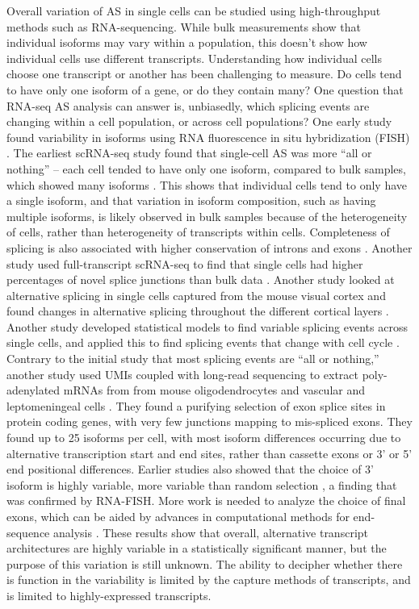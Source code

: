 Overall variation of AS in single cells can be studied using high\hyp{}throughput methods such as RNA-sequencing. While bulk measurements show that individual isoforms may vary within a population, this doesn't show how individual cells use different transcripts. Understanding how individual cells choose one transcript or another has been challenging to measure. Do cells tend to have only one isoform of a gene, or do they contain many? One question that RNA-seq AS analysis can answer is, unbiasedly, which splicing events are changing within a cell population, or across cell populations? One early study found variability in isoforms using RNA fluorescence in situ hybridization (FISH) \cite{Waks2011-ye}. The earliest scRNA-seq study found that single-cell AS was more ``all or nothing'' -- each cell tended to have only one isoform, compared to bulk samples, which showed many isoforms \cite{Shalek2013-ez}. This shows that individual cells tend to only have a single isoform, and that variation in isoform composition, such as having multiple isoforms, is likely observed in bulk samples because of the heterogeneity of cells, rather than heterogeneity of transcripts within cells. Completeness of splicing is also associated with higher conservation of introns and exons \cite{Faigenbloom2015-jo}. Another study used full-transcript scRNA-seq to find that single cells had higher percentages of novel splice junctions than bulk data \cite{Marinov2014-iw}. Another study looked at alternative splicing in single cells captured from the mouse visual cortex and found changes in alternative splicing throughout the different cortical layers \cite{Tasic2016-et}. Another study developed statistical models to find variable splicing events across single cells, and applied this to find splicing events that change with cell cycle \cite{Welch2016-it}. Contrary to the initial study that most splicing events are ``all or nothing,'' another study used UMIs coupled with long-read sequencing to extract poly-adenylated mRNAs from from mouse oligodendrocytes and vascular and leptomeningeal cells \cite{Karlsson2017-wy}. They found a purifying selection of exon splice sites in protein coding genes, with very few junctions mapping to mis-spliced exons. They found up to 25 isoforms per cell, with most isoform differences occurring due to alternative transcription start and end sites, rather than cassette exons or 3' or 5' end positional differences. Earlier studies also showed that the choice of 3' isoform is highly variable, more variable than random selection \cite{Velten2015-zd}, a finding that was confirmed by RNA-FISH. More work is needed to analyze the choice of final exons, which can be aided by advances in computational methods for end-sequence analysis \cite{Derr2016-pj}. These results show that overall, alternative transcript architectures are highly variable in a statistically significant manner, but the purpose of this variation is still unknown. The ability to decipher whether there is function in the variability \cite{Arbel-Goren2014-iq,Dueck2016-mr,Symmons2016-xn,Yap:2016iga} is limited by the capture methods of transcripts, and is limited to highly-expressed transcripts.

